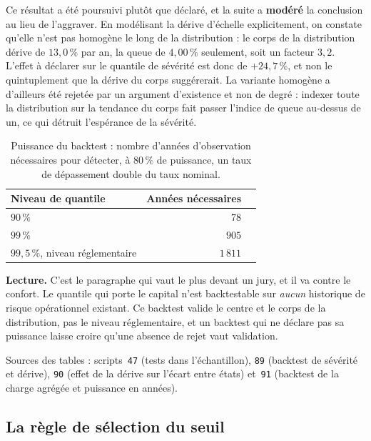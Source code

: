 \documentclass[12pt,a4paper]{article}
\theoremstyle{definition}
\begin{document}
Ce résultat a été poursuivi plutôt que déclaré, et la suite a \textbf{modéré} la
conclusion au lieu de l'aggraver. En modélisant la dérive d'échelle explicitement,
on constate qu'elle n'est pas homogène le long de la distribution : le corps de la
distribution dérive de $13{,}0\,\%$ par an, la queue de $4{,}00\,\%$ seulement,
soit un facteur $3{,}2$. L'effet à déclarer sur le quantile de sévérité est donc de
$+24{,}7\,\%$, et non le quintuplement que la dérive du corps suggérerait. La
variante homogène a d'ailleurs été rejetée par un argument d'existence et non de
degré : indexer toute la distribution sur la tendance du corps fait passer l'indice
de queue au-dessus de un, ce qui détruit l'espérance de la sévérité.

\begin{table}[htbp]
\centering\small
\renewcommand{\arraystretch}{1.2}
\begin{tabular}{@{}lrr@{}}
\toprule
\textbf{Niveau de quantile} & \textbf{Années nécessaires} & \\
\midrule
$90\,\%$   & $78$ & \\
$99\,\%$   & $905$ & \\
$99{,}5\,\%$, niveau réglementaire & $1\,811$ & \\
\bottomrule
\end{tabular}
\caption{Puissance du backtest : nombre d'années d'observation nécessaires pour
détecter, à $80\,\%$ de puissance, un taux de dépassement double du taux nominal.}
\label{tab:puissance}
\end{table}

\textbf{Lecture.} C'est le paragraphe qui vaut le plus devant un jury, et il va
contre le confort. Le quantile qui porte le capital n'est backtestable sur
\emph{aucun} historique de risque opérationnel existant. Ce backtest valide le
centre et le corps de la distribution, pas le niveau réglementaire, et un backtest
qui ne déclare pas sa puissance laisse croire qu'une absence de rejet vaut
validation.

\vspace{4pt}
\noindent Sources des tables : scripts~\texttt{47} (tests dans l'échantillon),
\texttt{89} (backtest de sévérité et dérive), \texttt{90} (effet de la dérive sur
l'écart entre états) et~\texttt{91} (backtest de la charge agrégée et puissance en
années).

\subsection{La règle de sélection du seuil}
\label{ss:seuil}
\end{document}
